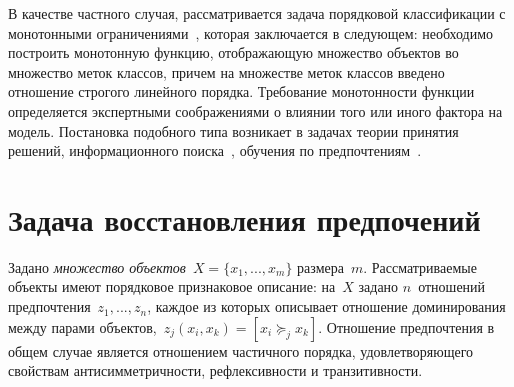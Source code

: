 \documentclass{elsarticle}
\begin{document}

В качестве частного случая, рассматривается задача порядковой классификации с монотонными ограничениями~\cite{Kotlowski2013, Corrente2013}, которая заключается в следующем: необходимо построить монотонную функцию, отображающую множество объектов во множество меток классов, причем на множестве меток классов введено отношение строгого линейного порядка. Требование монотонности функции определяется экспертными соображениями о влиянии того или иного фактора на модель. Постановка подобного типа возникает в задачах теории принятия решений, информационного поиска~\cite{Schafer2007,Trotman2005,Spirin2011}, обучения по предпочтениям~\cite{Fuernkranz2011}.
%


\section{Задача восстановления предпочений}
Задано \emph{множество объектов}~$X=\{x_1,...,x_m\}$ размера~$m$. Рассматриваемые объекты имеют порядковое признаковое описание: на~$X$ задано $n$~отношений предпочтения~$z_1,...,z_n$, каждое из которых описывает отношение доминирования между парами объектов,~$z_j(x_i,x_k)=[x_i\succeq_j x_k]$. Отношение предпочтения в общем случае является отношением частичного порядка, удовлетворяющего свойствам антисимметричности, рефлексивности и транзитивности.
\end{document}
